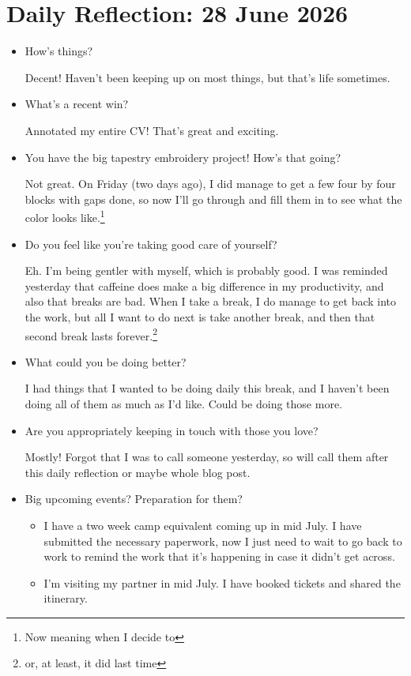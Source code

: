 \documentclass[12pt]{article}
\renewcommand{\,}{\textsuperscript{,}}
\begin{document}
\section{Daily Reflection: 28 June 2026}  
\begin{itemize}  
\item How's things?

Decent! Haven't been keeping up on most things, but that's life sometimes.

\item What's a recent win?

Annotated my entire CV! That's great and exciting.

\item You have the big tapestry embroidery project! How's that going?

Not great. On Friday (two days ago), I did manage to get a few four by four blocks with gaps done, so now I'll go through and fill them in to see what the color looks like.\footnote{Now meaning when I decide to}

\item Do you feel like you're taking good care of yourself?

Eh. I'm being gentler with myself, which is probably good. I was reminded yesterday that caffeine does make a big difference in my productivity, and also that breaks are bad.  
When I take a break, I do manage to get back into the work, but all I want to do next is take another break, and then that second break lasts forever.\footnote{or, at least, it did last time}

\item What could you be doing better?

I had things that I wanted to be doing daily this break, and I haven't been doing all of them as much as I'd like. Could be doing those more.

\item Are you appropriately keeping in touch with those you love?

Mostly! Forgot that I was to call someone yesterday, so will call them after this daily reflection or maybe whole blog post.

\item Big upcoming events? Preparation for them?

\begin{itemize}

\item I have a two week camp equivalent coming up in mid July. I have submitted the necessary paperwork, now I just need to wait to go back to work to remind the work that it's happening in case it didn't get across.  
\item I'm visiting my partner in mid July. I have booked tickets and shared the itinerary.


\end{itemize}
\end{itemize}
\end{document}
